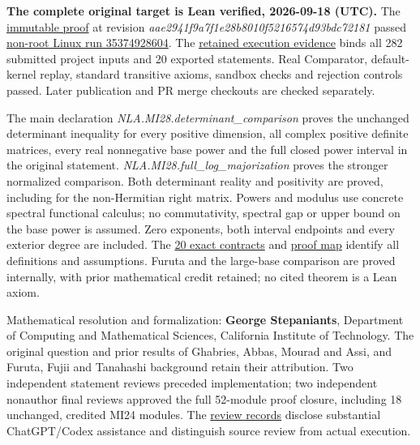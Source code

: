 \documentclass[11pt,a4paper]{article}
\makeatletter
\renewcommand{\subsection}{\Needspace{4\baselineskip}\@startsection{subsection}{2}{0pt}{9pt plus 1pt minus 1pt}{3pt}{\sffamily\bfseries\normalsize\color{ink}}}
\makeatother
\begin{document}
\newpage

\subsection{Lean proof and verification
evidence}\label{lean-proof-and-verification-evidence}

\textbf{The complete original target is Lean verified, 2026-09-18
(UTC).} The
\href{https://github.com/sgstepaniants/OpenProblemsInNLA/blob/aae2941f9a7f1e28b8010f5216574d93bdc72181/matrix-inequalities-and-norms/MI-28/lean/Solution.lean}{immutable
proof} at revision \textit{aae2941f9a7f1e28b8010f5216574d93bdc72181}
passed
\href{https://github.com/sgstepaniants/OpenProblemsInNLA/actions/runs/35374928604/job/105697400237}{non-root
Linux run 35374928604}. The
\href{https://github.com/ajt60gaibb/OpenProblemsInNLA/blob/main/matrix-inequalities-and-norms/MI-28/lean/verification/linux-2026-09-18/README.md}{retained
execution evidence} binds all 282 submitted project inputs and 20
exported statements. Real Comparator, default-kernel replay, standard
transitive axioms, sandbox checks and rejection controls passed. Later
publication and PR merge checkouts are checked separately.

The main declaration \textit{NLA.MI28.determinant\_comparison} proves
the unchanged determinant inequality for every positive dimension, all
complex positive definite matrices, every real nonnegative base power
and the full closed power interval in the original statement.
\textit{NLA.MI28.full\_log\_majorization} proves the stronger normalized
comparison. Both determinant reality and positivity are proved,
including for the non-Hermitian right matrix. Powers and modulus use
concrete spectral functional calculus; no commutativity, spectral gap or
upper bound on the base power is assumed. Zero exponents, both interval
endpoints and every exterior degree are included. The
\href{https://github.com/ajt60gaibb/OpenProblemsInNLA/blob/main/matrix-inequalities-and-norms/MI-28/lean/Challenge.lean}{20
exact contracts} and
\href{https://github.com/ajt60gaibb/OpenProblemsInNLA/blob/main/matrix-inequalities-and-norms/MI-28/lean/PROOF-REVIEWER-MAP.md}{proof
map} identify all definitions and assumptions. Furuta and the large-base
comparison are proved internally, with prior mathematical credit
retained; no cited theorem is a Lean axiom.

Mathematical resolution and formalization: \textbf{George Stepaniants},
Department of Computing and Mathematical Sciences, California Institute
of Technology. The original question and prior results of Ghabries,
Abbas, Mourad and Assi, and Furuta, Fujii and Tanahashi background
retain their attribution. Two independent statement reviews preceded
implementation; two independent nonauthor final reviews approved the
full 52-module proof closure, including 18 unchanged, credited MI24
modules. The
\href{https://github.com/ajt60gaibb/OpenProblemsInNLA/blob/main/matrix-inequalities-and-norms/MI-28/lean/REVIEW-INDEX.md}{review
records} disclose substantial ChatGPT/Codex assistance and distinguish
source review from actual execution.
\end{document}
